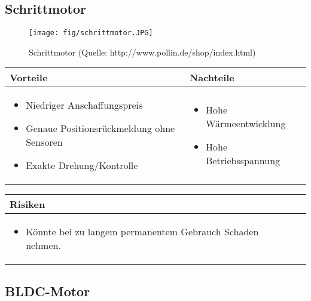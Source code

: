 \pagebreak


\subsection{Schrittmotor}

\begin{figure}[h!]%
\centering
\texttt{[image: fig/schrittmotor.JPG]}
\caption{Schrittmotor (Quelle: http://www.pollin.de/shop/index.html)}
\label{fig:Java}
\end{figure}

\begin{table}[h]
\begin{tabular}{p{} | p{}}


 \textbf{Vorteile} & \textbf{Nachteile} \\ \hline
	 
\begin{itemize}
\item Niedriger Anschaffungspreis
\item Genaue Positionsrückmeldung ohne Sensoren
\item Exakte Drehung/Kontrolle
\end{itemize}

 
 &
 
\begin{itemize}
\item Hohe Wärmeentwicklung
\item Hohe Betriebsspannung
\end{itemize}

\end{tabular}
\end{table}

\begin{table}[h]
\begin{tabular}{p{}p{}}


 \textbf{Risiken} & \\ \hline
	 
\begin{itemize}
\item Könnte bei zu langem permanentem Gebrauch Schaden nehmen.
\end{itemize}

 
\end{tabular}
\end{table}

\pagebreak

\subsection{BLDC-Motor}


